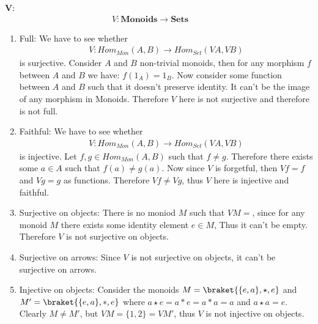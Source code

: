 \textbf{V}:
\begin{gather*}
    V: \textbf{Monoids} \to \textbf{Sets} \phantom{salsl}
\end{gather*}
\begin{center}
\end{center}
\begin{enumerate}[label=\ilabel]
    \item 
        Full: We have to see whether
        \begin{gather*}
            V: Hom_{Mon}(A, B) \to Hom_{Set}(VA, VB)
        \end{gather*}
        is surjective. Consider $A$ and $B$ non-trivial monoids, then for any morphism $f$ between $A$ and $B$ we have: $f(1_A) = 1_B$. Now consider some function between $A$ and $B$ such that it doesn't preserve identity. It can't be the image of any morphism in Monoids. Therefore $V$ here is not surjective and therefore is not full.
    \item
        Faithful: We have to see whether 
        \begin{gather*}
            V: Hom_{Mon}(A, B) \to Hom_{Set}(VA, VB)
        \end{gather*}
        is injective. Let $f, g \in Hom_{Mon}(A, B)$ such that $f \ne g$. Therefore there exists some $a \in A$ such that $f(a) \ne g(a)$. Now since $V$ is forgetful, then $Vf = f$ and $Vg = g$ as functions. Therefore $Vf \ne Vg$, thus $V$ here is injective and faithful.
    \item 
        Surjective on objects: There is no moniod $M$ such that $VM = {}$, since for any monoid $M$ there exists some identity element $e \in M$, Thus it can't be empty. Therefore $V$ is not surjective on objects.
    \item
        Surjective on arrows: Since $V$ is not surjective on objects, it can't be surjective on arrows.
    \item
        Injective on objects: Consider the monoids $M = \braket{\{e, a\}, \star, e}$ and $M' = \braket{\{e, a\}, \ast, e}$ where $a \star e = a \ast e = a \ast a = a$ and $a \star a = e$. Clearly $M \ne M'$, but $VM = \{1, 2\} = VM'$, thus $V$ is not injective on objects.

\end{enumerate}
